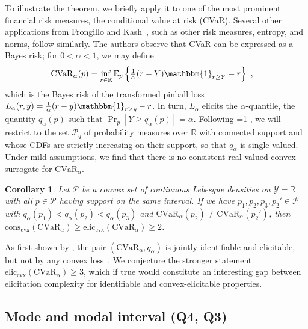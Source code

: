 \documentclass[11pt]{article} %
\newcommand{\Comments}{1}
\newcommand{\mytodo}[2]{\ifnum\Comments=1%
	\todo[linecolor=#1!80!black,backgroundcolor=#1,bordercolor=#1!80!black]{#2}\fi}
\newcommand{\jessiet}[1]{\mytodo{teal!20!white}{JF: #1}}
\newcommand{\reals}{\mathbb{R}}
\newcommand{\eliccvx}{\mathrm{elic}_\mathrm{cvx}}
\newcommand{\conscvx}{\mathrm{cons}_\mathrm{cvx}}
\newcommand{\E}{\mathbb{E}}
\renewcommand{\P}{\mathcal{P}}
\newcommand{\Y}{\mathcal{Y}}
\newcommand{\CVaR}{\mathrm{CVaR}}
\newcommand{\ones}{\mathbbm{1}}
\newtheorem{corollary}{Corollary}
\begin{document}
To illustrate the theorem, we briefly apply it to one of the most prominent financial risk measures, the conditional value at risk (CVaR).
Several other applications from Frongillo and Kash~\citep{frongillo2020elicitation,frongillo2015elicitation}, such as other risk measures, entropy, and norms, follow similarly.
The authors observe that CVaR can be expressed as a Bayes risk; for $0 < \alpha < 1$, we may define
\begin{align}
  \CVaR_\alpha(p)
  &= \inf_{r\in\reals} \E_p\left\{ \tfrac 1 \alpha(r-Y)\ones_{r\geq Y}- r\right\}~,
  \label{eq:elic-complex-es-3}
\end{align}
which is the Bayes risk of the transformed pinball loss $L_\alpha(r,y) = \tfrac 1 \alpha(r-y)\ones_{r\geq y}-r$.
In turn, $L_\alpha$ elicits the $\alpha$-quantile, the quantity $q_\alpha(p)$ such that $\Pr_p[Y \geq q_\alpha(p)] = \alpha$.
Following \citet{frongillo2020elicitation}\jessiet{Leaving as just the 2020 cite}, we will restrict to the set $\P_q$ of probability measures over $\reals$ with connected support and whose CDFs are strictly increasing on their support, so that $q_\alpha$ is single-valued.
Under mild assumptions, we find that there is no consistent real-valued convex surrogate for $\CVaR_\alpha$.

\begin{corollary}
  \label{cor:spectral-risks}
  Let $\P$ be a convex set of continuous Lebesgue densities on $\Y=\reals$ with all $p \in \P$ having support on the same interval.
  If we have $p_1,p_2,p_3,p_2'\in\P$ with $q_\alpha(p_1) < q_\alpha(p_2) < q_\alpha(p_3)$ and $\CVaR_\alpha(p_2) \neq \CVaR_\alpha(p_2')$,
  then $\conscvx(\CVaR_\alpha) \geq \eliccvx(\CVaR_\alpha) \geq 2$.
\end{corollary}
As first shown by \citet{fissler2016higher}, the pair $(\CVaR_\alpha,q_\alpha)$ is jointly identifiable and elicitable, but not by any convex loss~\citep[Prop.\ 4.2.31]{fissler2017higher}.%
We conjecture the stronger statement $\eliccvx(\CVaR_\alpha) \geq 3$, which if true would constitute an interesting gap between elicitation complexity for identifiable and convex-elicitable properties.

\subsection{Mode and modal interval (Q4, Q3)}
\label{sec:mode-modal-interval}
\end{document}
